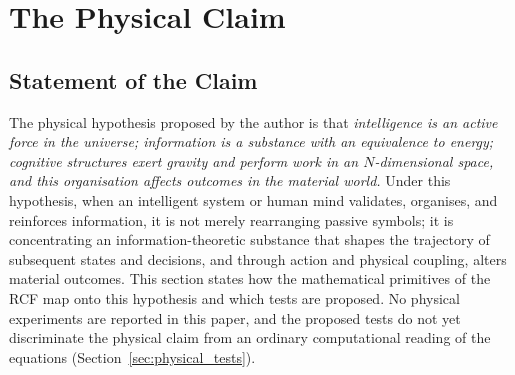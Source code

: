 \documentclass[11pt]{article}
\theoremstyle{remark}
\begin{document}
\section{The Physical Claim}
\label{sec:physical_claim}

\subsection{Statement of the Claim}
The physical hypothesis proposed by the author is that \emph{intelligence is an active force in the universe; information is a substance with an equivalence to energy; cognitive structures exert gravity and perform work in an $N$-dimensional space, and this organisation affects outcomes in the material world.} Under this hypothesis, when an intelligent system or human mind validates, organises, and reinforces information, it is not merely rearranging passive symbols; it is concentrating an information-theoretic substance that shapes the trajectory of subsequent states and decisions, and through action and physical coupling, alters material outcomes. This section states how the mathematical primitives of the RCF map onto this hypothesis and which tests are proposed. No physical experiments are reported in this paper, and the proposed tests do not yet discriminate the physical claim from an ordinary computational reading of the equations (Section~\ref{sec:physical_tests}).
\end{document}
